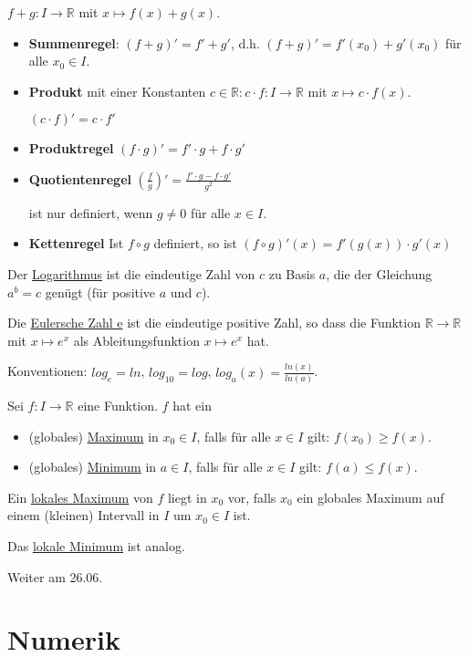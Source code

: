 \documentclass{mg2}
\begin{document}
$f+g: I \to \mathbb{R}$ mit $x \mapsto f(x) + g(x)$.
\begin{itemize}
\item \textbf{Summenregel}: $(f+g)' = f' + g'$, d.h. $(f+g)' = f'(x_0) + g'(x_0)$ für alle $x_0 \in I$.
\item \textbf{Produkt} mit einer Konstanten $c \in \mathbb{R}: c \cdot f: I \to \mathbb{R}$ mit $x \mapsto c \cdot f(x)$.

	$(c\cdot f)' = c \cdot f'$
\item \textbf{Produktregel} $(f\cdot g)' = f' \cdot g + f \cdot g'$
\item \textbf{Quotientenregel} $(\frac{f}{g})' = \frac{f' \cdot g - f \cdot g'}{g^2}$
	
	ist nur definiert, wenn $g \neq 0$ für alle $x \in I$.
\item \textbf{Kettenregel} Ist $f \circ g$ definiert, so ist $(f \circ g)'(x) = f'(g(x)) \cdot g'(x)$
\end{itemize}

\begin{definition}[Logarithmus]
Der \underline{Logarithmus} ist die eindeutige Zahl von $c$ zu Basis $a$, die der Gleichung $a^b = c$ genügt (für positive $a$ und $c$).
\end{definition}

\begin{definition}
Die \underline{Eulersche Zahl e} ist die eindeutige positive Zahl, so dass die Funktion $\mathbb{R} \to \mathbb{R}$ mit $x \mapsto e^x$ als Ableitungsfunktion $x \mapsto e^x$ hat.

Konventionen: $log_e = ln$, $log_{10} = log$, $log_a (x) = \frac{ln(x)}{ln(a)}$.
\end{definition}

\begin{definition}
Sei $f: I \to \mathbb{R}$ eine Funktion. $f$ hat ein
\begin{itemize}
\item (globales) \underline{Maximum} in $x_0 \in I$, falls für alle $x \in I$ gilt: $f(x_0) \geq f(x)$.
\item (globales) \underline{Minimum} in $a \in I$, falls für alle $x \in I$ gilt: $f(a) \leq f(x)$.
\end{itemize}
\end{definition}

\begin{definition}
Ein \underline{lokales Maximum} von $f$ liegt in $x_0$ vor, falls $x_0$ ein globales Maximum auf einem (kleinen) Intervall in $I$ um $x_0 \in I$ ist.

Das \underline{lokale Minimum} ist analog.
\end{definition}

Weiter am 26.06.
\section{Numerik}
\end{document}
